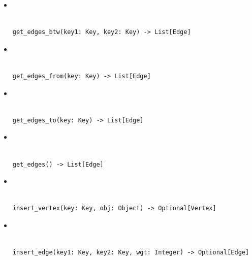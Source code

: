 \documentclass[mathserif, handout]{beamer}
\begin{document}
\begin{frame}[fragile]
	\begin{itemize}
		\item {} \\
		      \\[-1mm]
		      \begin{lstlisting}[style=mypython]
get_edges_btw(key1: Key, key2: Key) -> List[Edge]
\end{lstlisting}

		\item {} \\
		      \\[-1mm]
		      \begin{lstlisting}[style=mypython]
get_edges_from(key: Key) -> List[Edge]
\end{lstlisting}

		\item {} \\
		      \\[-1mm]
		      \begin{lstlisting}[style=mypython]
get_edges_to(key: Key) -> List[Edge]
\end{lstlisting}

		\item {} \\
		      \\[-1mm]
		      \begin{lstlisting}[style=mypython]
get_edges() -> List[Edge]
\end{lstlisting}

	\end{itemize}
\end{frame}

\begin{frame}[fragile]

	\begin{itemize}

		\item {} \\
		      \\[-1mm]
		      \begin{lstlisting}[style=mypython]
insert_vertex(key: Key, obj: Object) -> Optional[Vertex]
\end{lstlisting}

		\item {} \\
		      \\[-1mm]
		      \begin{lstlisting}[style=mypython]
insert_edge(key1: Key, key2: Key, wgt: Integer) -> Optional[Edge]
\end{lstlisting}

	\end{itemize}
\end{frame}
\end{document}
